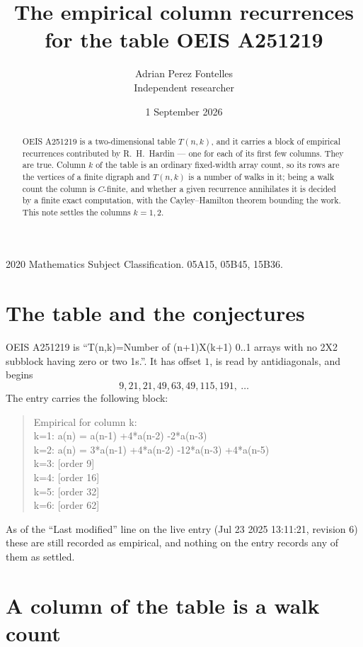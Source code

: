 \documentclass[11pt,a4paper]{article}
\title{The empirical column recurrences for the table OEIS A251219}
\author{Adrian Perez Fontelles\\ \small Independent researcher}
\date{1 September 2026}
\theoremstyle{plain}
\theoremstyle{definition}
\begin{document}
\maketitle

\begin{abstract}
OEIS A251219 is a two-dimensional table $T(n,k)$, and it carries a block of empirical
recurrences contributed by R.~H.~Hardin --- one for each of its first few columns. They are
true. Column $k$ of the table is an ordinary fixed-width array count, so its rows are the
vertices of a finite digraph and $T(n,k)$ is a number of walks in it; being a walk count the
column is $C$-finite, and whether a given recurrence annihilates it is decided by a finite
exact computation, with the Cayley--Hamilton theorem bounding the work. This note settles the
columns $k=1, 2$.
\end{abstract}

\noindent\small 2020 Mathematics Subject Classification. 05A15, 05B45, 15B36.\normalsize

\section{The table and the conjectures}

OEIS A251219 is ``T(n,k)=Number of (n+1)X(k+1) 0..1 arrays with no 2X2 subblock having zero or two 1s.''. It has offset $1$, is
read by antidiagonals, and begins
\[
9, 21, 21, 49, 63, 49, 115, 191,\ \dots
\]
The entry carries the following block:
\begin{quote}\small
Empirical for column k:\\
k=1: a(n) = a(n-1) +4*a(n-2) -2*a(n-3)\\
k=2: a(n) = 3*a(n-1) +4*a(n-2) -12*a(n-3) +4*a(n-5)\\
k=3: [order 9]\\
k=4: [order 16]\\
k=5: [order 32]\\
k=6: [order 62]\\
\end{quote}
As of the ``Last modified'' line on the live entry (Jul 23 2025 13:11:21, revision 6) these are still
recorded as empirical, and nothing on the entry records any of them as settled.

\section{A column of the table is a walk count}
\end{document}
